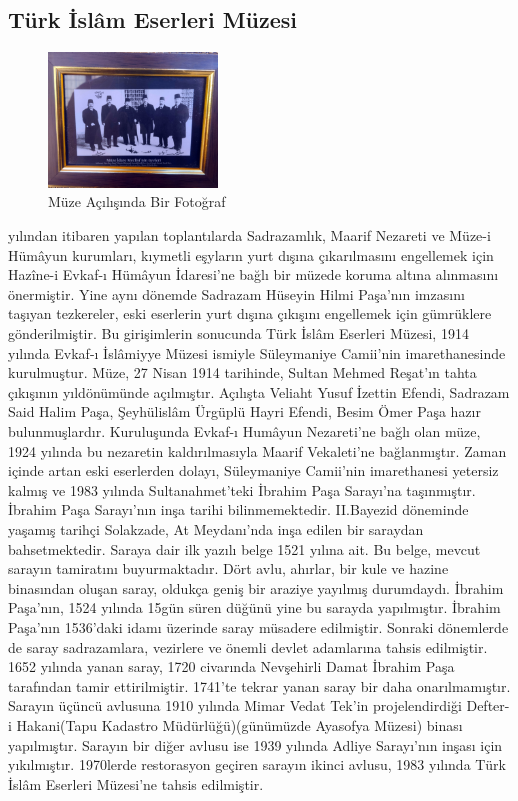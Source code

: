 \subsection{Türk İslâm Eserleri Müzesi}
\begin{figure}
    \includegraphics[width=0.4\textwidth]{assets/museum_opening.jpg}
    \caption{Müze Açılışında Bir Fotoğraf}
    \label{fig:musem_opening}
\end{figure}
\indent{} yılından itibaren yapılan toplantılarda Sadrazamlık, Maarif Nezareti ve Müze-i Hümâyun kurumları, kıymetli eşyların yurt dışına çıkarılmasını engellemek için Hazîne-i Evkaf-ı Hümâyun İdaresi'ne bağlı bir müzede koruma altına alınmasını önermiştir. Yine aynı dönemde Sadrazam Hüseyin Hilmi Paşa'nın imzasını taşıyan tezkereler, eski eserlerin yurt dışına çıkışını engellemek için gümrüklere gönderilmiştir. Bu girişimlerin sonucunda Türk İslâm Eserleri Müzesi, 1914 yılında Evkaf-ı İslâmiyye Müzesi ismiyle Süleymaniye Camii'nin imarethanesinde kurulmuştur. Müze, 27 Nisan 1914 tarihinde, Sultan Mehmed Reşat'ın tahta çıkışının yıldönümünde açılmıştır. Açılışta Veliaht Yusuf İzettin Efendi, Sadrazam Said Halim Paşa, Şeyhülislâm Ürgüplü Hayri Efendi, Besim Ömer Paşa hazır bulunmuşlardır. Kuruluşunda Evkaf-ı Humâyun Nezareti'ne bağlı olan müze, 1924 yılında bu nezaretin kaldırılmasıyla Maarif Vekaleti'ne bağlanmıştır. Zaman içinde artan eski eserlerden dolayı, Süleymaniye Camii'nin imarethanesi yetersiz kalmış ve 1983 yılında Sultanahmet'teki İbrahim Paşa Sarayı'na taşınmıştır.\cite{dia_2}\newline
\indent İbrahim Paşa Sarayı'nın inşa tarihi bilinmemektedir. II.Bayezid döneminde yaşamış tarihçi Solakzade, At Meydanı'nda inşa edilen bir saraydan bahsetmektedir.\cite{atasoy_1} Saraya dair ilk yazılı belge 1521 yılına ait. Bu belge, mevcut sarayın tamiratını buyurmaktadır. Dört avlu, ahırlar, bir kule ve hazine binasından oluşan saray, oldukça geniş bir araziye yayılmış durumdaydı. İbrahim Paşa'nın, 1524 yılında 15gün süren düğünü yine bu sarayda yapılmıştır. İbrahim Paşa'nın 1536'daki idamı üzerinde saray müsadere edilmiştir. Sonraki dönemlerde de saray sadrazamlara, vezirlere ve önemli devlet adamlarına tahsis edilmiştir. 1652 yılında yanan saray, 1720 civarında Nevşehirli Damat İbrahim Paşa tarafından tamir ettirilmiştir. 1741'te tekrar yanan saray bir daha onarılmamıştır.\cite{dia_3} Sarayın üçüncü avlusuna 1910 yılında Mimar Vedat Tek'in projelendirdiği Defter-i Hakani(Tapu Kadastro Müdürlüğü)(günümüzde Ayasofya Müzesi) binası yapılmıştır. Sarayın bir diğer avlusu ise 1939 yılında Adliye Sarayı'nın inşası için yıkılmıştır. 1970lerde restorasyon geçiren sarayın ikinci avlusu, 1983 yılında Türk İslâm Eserleri Müzesi'ne tahsis edilmiştir.\cite{atasoy_2}
